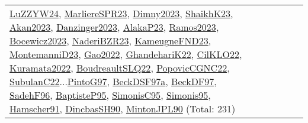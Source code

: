 {\begin{longtable}{p{3cm}r>{\raggedright\arraybackslash}p{6cm}>{\raggedright\arraybackslash}p{6cm}>{\raggedright\arraybackslash}p{8cm}}
\hyperref[detail:LuZZYW24]{LuZZYW24}, \hyperref[detail:MarliereSPR23]{MarliereSPR23}, \hyperref[detail:Dimny2023]{Dimny2023}, \hyperref[detail:ShaikhK23]{ShaikhK23}, \hyperref[detail:Akan2023]{Akan2023}, \hyperref[detail:Danzinger2023]{Danzinger2023}, \hyperref[detail:AlakaP23]{AlakaP23}, \hyperref[detail:Ramos2023]{Ramos2023}, \hyperref[detail:Bocewicz2023]{Bocewicz2023}, \hyperref[detail:NaderiBZR23]{NaderiBZR23}, \hyperref[detail:KameugneFND23]{KameugneFND23}, \hyperref[detail:MontemanniD23]{MontemanniD23}, \hyperref[detail:Gao2022]{Gao2022}, \hyperref[detail:GhandehariK22]{GhandehariK22}, \hyperref[detail:CilKLO22]{CilKLO22}, \hyperref[detail:Kuramata2022]{Kuramata2022}, \hyperref[detail:BoudreaultSLQ22]{BoudreaultSLQ22}, \hyperref[detail:PopovicCGNC22]{PopovicCGNC22}, \hyperref[detail:SubulanC22]{SubulanC22}...\hyperref[detail:PintoG97]{PintoG97}, \hyperref[detail:BeckDSF97a]{BeckDSF97a}, \hyperref[detail:BeckDF97]{BeckDF97}, \hyperref[detail:SadehF96]{SadehF96}, \hyperref[detail:BaptisteP95]{BaptisteP95}, \hyperref[detail:SimonisC95]{SimonisC95}, \hyperref[detail:Simonis95]{Simonis95}, \hyperref[detail:Hamscher91]{Hamscher91}, \hyperref[detail:DincbasSH90]{DincbasSH90}, \hyperref[detail:MintonJPL90]{MintonJPL90} (Total: 231)\\

\end{longtable}}
